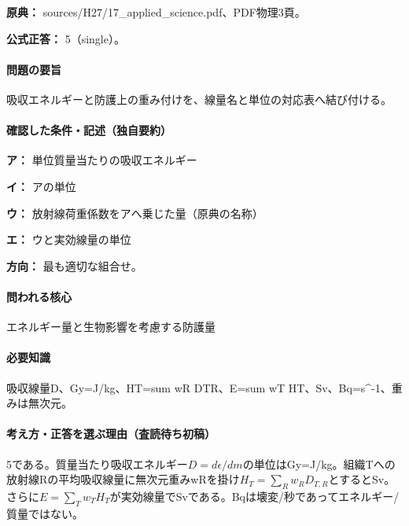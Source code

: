 \noindent\textbf{原典：} sources/H27/17\_applied\_science.pdf、PDF物理3頁。

\textbf{公式正答：} 5（single）。

\paragraph{問題の要旨} 吸収エネルギーと防護上の重み付けを、線量名と単位の対応表へ結び付ける。

\paragraph{確認した条件・記述（独自要約）}\mbox{}\par

\noindent\textbf{ア：} 単位質量当たりの吸収エネルギー\par

\noindent\textbf{イ：} アの単位\par

\noindent\textbf{ウ：} 放射線荷重係数をアへ乗じた量（原典の名称）\par

\noindent\textbf{エ：} ウと実効線量の単位\par

\noindent\textbf{方向：} 最も適切な組合せ。\par

\paragraph{問われる核心} エネルギー量と生物影響を考慮する防護量

\paragraph{必要知識} 吸収線量D、Gy=\allowbreak{}J/kg、HT=\allowbreak{}sum wR DTR、E=\allowbreak{}sum wT HT、Sv、Bq=\allowbreak{}s\textasciicircum{}-1、重みは無次元。

\paragraph{考え方・正答を選ぶ理由（査読待ち初稿）} 5である。質量当たり吸収エネルギー\(D=d\epsilon/dm\)の単位はGy=\allowbreak{}J/kg。組織Tへの放射線Rの平均吸収線量に無次元重みwRを掛け\(H_T=\sum_Rw_RD_{T,R}\)とするとSv。さらに\(E=\sum_Tw_TH_T\)が実効線量でSvである。Bqは壊変/秒であってエネルギー/質量ではない。

